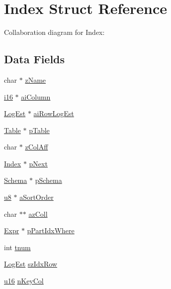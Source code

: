 \hypertarget{struct_index}{}\section{Index Struct Reference}
\label{struct_index}


Collaboration diagram for Index\+:
\subsection*{Data Fields}
\begin{DoxyCompactItemize}
\item 
char $\ast$ \hyperlink{struct_index_a661118d86ac4127d40bf3be78d92117d}{z\+Name}
\item 
\hyperlink{sqlite3_8c_a7b32340f65cd15f029caad258fb3355c}{i16} $\ast$ \hyperlink{struct_index_a60b1008813549b5b60155ed0f9656000}{ai\+Column}
\item 
\hyperlink{sqlite3_8c_aa0f9b3b63ad120ac15b96785b05ce733}{Log\+Est} $\ast$ \hyperlink{struct_index_aab6ba3928ad4eefe19dbf7639b25ad44}{ai\+Row\+Log\+Est}
\item 
\hyperlink{struct_table}{Table} $\ast$ \hyperlink{struct_index_a588ce43da42d3ce58d9ac3c5c2c6c4d4}{p\+Table}
\item 
char $\ast$ \hyperlink{struct_index_a829718486911afcd2a61c54f28491d76}{z\+Col\+Aff}
\item 
\hyperlink{struct_index}{Index} $\ast$ \hyperlink{struct_index_a66a59da0320c08c1411d1fff7b44d5dd}{p\+Next}
\item 
\hyperlink{struct_schema}{Schema} $\ast$ \hyperlink{struct_index_ac262c2ca980f0326edbe82bbe7fda205}{p\+Schema}
\item 
\hyperlink{sqlite3_8c_a74a0f6424ae628af25f23f0a35f6ead3}{u8} $\ast$ \hyperlink{struct_index_ace4725075c963b97eb9a9a0db1be905b}{a\+Sort\+Order}
\item 
char $\ast$$\ast$ \hyperlink{struct_index_a7433f80ab83ca3f61a37ab747e351a3a}{az\+Coll}
\item 
\hyperlink{struct_expr}{Expr} $\ast$ \hyperlink{struct_index_a5636262a85d6a3220d90d1c7da28e77b}{p\+Part\+Idx\+Where}
\item 
int \hyperlink{struct_index_a2943a2c9e4915d379274c39cbb0147d9}{tnum}
\item 
\hyperlink{sqlite3_8c_aa0f9b3b63ad120ac15b96785b05ce733}{Log\+Est} \hyperlink{struct_index_af692ae2e419556548771cb3d1ec2b058}{sz\+Idx\+Row}
\item 
\hyperlink{sqlite3_8c_a20f2299e322dcbde37cb07b16910b843}{u16} \hyperlink{struct_index_ad021b71c3156753c5b435d50b6e42255}{n\+Key\+Col}
$$
\end{DoxyCompactItemize}
